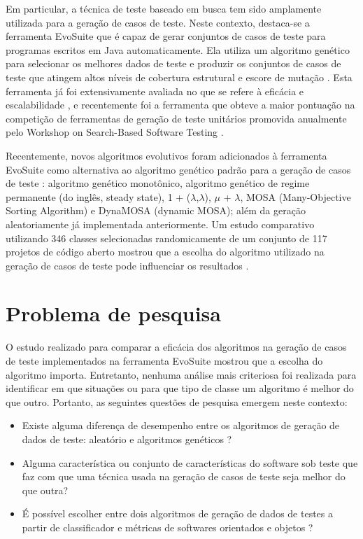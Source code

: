\documentclass[
	12pt,				%
	oneside,			%
	a4paper,			%
	english,			%
	brazil				%
	]{abntex2ppgsi}
\begin{document}
Em particular, a técnica de teste baseado em busca tem sido amplamente utilizada para a geração de casos de teste. Neste contexto, destaca-se a ferramenta EvoSuite que é capaz de gerar conjuntos de casos de teste para programas escritos em Java automaticamente. Ela utiliza um algoritmo genético para selecionar os melhores dados de teste e produzir os conjuntos de casos de teste que atingem altos níveis de cobertura estrutural e escore de mutação \cite{Fraser2011}. Esta ferramenta já foi extensivamente avaliada no que se refere à eficácia e escalabilidade \cite{Fraser2013, Rojas2017, Fraser2015, Fraser2014}, e recentemente foi a ferramenta que obteve a maior pontuação na competição de ferramentas de geração de teste unitários promovida anualmente pelo Workshop on Search-Based Software Testing \cite{Fraser2017}.

Recentemente, novos algoritmos evolutivos foram adicionados à ferramenta EvoSuite como alternativa ao algoritmo genético padrão para a geração de casos de teste \cite{Campos2017}:  algoritmo genético monotônico, algoritmo genético de regime permanente (do inglês, steady state), 1 + ($\lambda$,$\lambda$), $\mu$ + $\lambda$, MOSA (Many-Objective Sorting Algorithm) e DynaMOSA (dynamic MOSA); além da geração aleatoriamente já implementada anteriormente. Um estudo comparativo utilizando 346 classes selecionadas randomicamente de um conjunto de 117 projetos de código aberto mostrou que a escolha do algoritmo utilizado na geração de casos de teste pode influenciar os resultados \cite{Campos2017}.

\section{Problema de pesquisa}

O estudo realizado para comparar a eficácia dos algoritmos na geração de casos de teste implementados na ferramenta EvoSuite mostrou que a escolha do algoritmo importa. Entretanto, nenhuma análise mais criteriosa foi realizada para identificar em que situações ou para que tipo de classe um algoritmo é melhor do que outro. Portanto, as seguintes questões de pesquisa emergem neste contexto:

\begin{itemize}
 \item Existe alguma diferença de desempenho entre os algoritmos de geração de dados de teste: aleatório e algoritmos genéticos ?
 \item Alguma característica ou conjunto de características do software sob teste que faz com que uma técnica usada na geração de casos de teste seja melhor do que outra?
\item É possível escolher entre dois algoritmos de geração de dados de testes a partir de classificador e métricas de softwares orientados e objetos ?

\end{itemize}
\end{document}
